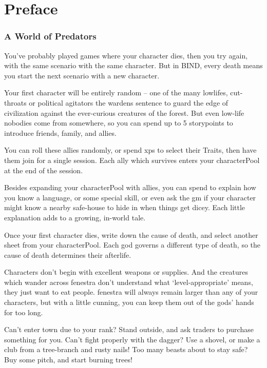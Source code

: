 \chapter{Preface}

\begin{multicols}{2}

\subsection*{A World of Predators}

You've probably played games where your character dies, then you try again, with the same scenario with the same character.
But in BIND, every death means you start the next scenario with a new character.

Your first character will be entirely random -- one of the many lowlifes, cut-throats or political agitators the \glspl{warden} sentence to guard the \gls{edge} of civilization against the ever-curious creatures of the forest.
But even low-life nobodies come from somewhere, so you can spend up to 5 \glspl{storypoint} to introduce friends, family, and allies.

You can roll these allies randomly, or spend \glspl{xp} to select their Traits, then have them join for a single session.
Each ally which survives enters your \gls{characterPool} at the end of the session.

Besides expanding your \gls{characterPool} with allies, you can spend  to explain how you know a language, or some special skill, or even ask the \gls{gm} if your character might know a nearby safe-house to hide in when things get dicey.
Each little explanation adds to a growing, in-world tale.

Once your first character dies, write down the cause of death, and select another sheet from your \gls{characterPool}.
Each god governs a different type of death, so the cause of death determines their afterlife.

Characters don't begin with excellent weapons or supplies.
And the creatures which wander across \gls{fenestra} don't understand what `level-appropriate' means, they just want to eat people.
\Gls{fenestra} will always remain larger than any of your characters, but with a little cunning, you can keep them out of the gods' hands for too long.

Can't enter town due to your rank?
Stand outside, and ask traders to purchase something for you.
Can't fight properly with the dagger?
Use a shovel, or make a club from a tree-branch and rusty nails!
Too many beasts about to stay safe?
Buy some pitch, and start burning trees!


\end{multicols}
